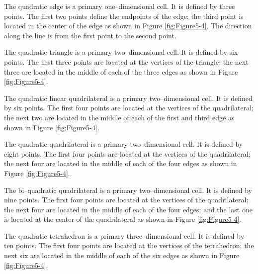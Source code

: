 \begin{description}[leftmargin=0cm,labelindent=0cm]

\item[Quadratic Edge.\index{cell!quadratic edge}\index{quadratic edge}] The quadratic edge is a primary one--dimensional cell. It is defined by three points. The first two points define the endpoints of the edge; the third point is located in the center of the edge as shown in Figure \ref{fig:Figure5-4}. The direction along the line is from the first point to the second point.

\item[Quadratic Triangle.\index{cell!quadratic triangle}\index{quadratic triangle}] The quadratic triangle is a primary two--dimensional cell. It is defined by six points. The first three points are located at the vertices of the triangle; the next three are located in the middle of each of the three edges as shown in Figure \ref{fig:Figure5-4}.

\item[Quadratic Linear Quadrilateral.\index{cell!quadratic linear quadrilateral}\index{quadratic linear quadrilateral}] The quadratic linear quadrilateral is a primary two--dimensional cell. It is defined by six points. The first four points are located at the vertices of the quadrilateral; the next two are located in the middle of each of the first and third edge as shown in Figure \ref{fig:Figure5-4}.

\item[Quadratic Quadrilateral.\index{cell!quadratic quadrilateral}\index{quadratic quadrilateral}] The quadratic quadrilateral is a primary two--dimensional cell. It is defined by eight points. The first four points are located at the vertices of the quadrilateral; the next four are located in the middle of each of the four edges as shown in Figure \ref{fig:Figure5-4}.

\item[Bi--Quadratic Quadrilateral.\index{bi-quadratic quadrilateral}\index{cell!bi-quadratic quadrilateral}] The bi--quadratic quadrilateral is a primary two--dimensional cell. It is defined by nine points. The first four points are located at the vertices of the quadrilateral; the next four are located in the middle of each of the four edges; and the last one is located at the center of the quadrilateral as shown in Figure \ref{fig:Figure5-4}.

\item[Quadratic Tetrahedron.\index{cell!quadratic tetrahedron}\index{quadratic tetrahedron}] The quadratic tetrahedron is a primary three--dimensional cell. It is defined by ten points. The first four points are located at the vertices of the tetrahedron; the next six are located in the middle of each of the six edges as shown in Figure \ref{fig:Figure5-4}.


\end{description}
